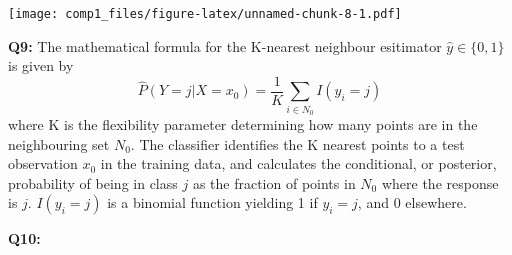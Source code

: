 \documentclass[]{article}
\newenvironment{Shaded}{\begin{snugshade}}{\end{snugshade}}
\newcommand{\KeywordTok}[1]{\textcolor[rgb]{0.13,0.29,0.53}{\textbf{#1}}}
\newcommand{\DataTypeTok}[1]{\textcolor[rgb]{0.13,0.29,0.53}{#1}}
\newcommand{\DecValTok}[1]{\textcolor[rgb]{0.00,0.00,0.81}{#1}}
\newcommand{\StringTok}[1]{\textcolor[rgb]{0.31,0.60,0.02}{#1}}
\newcommand{\CommentTok}[1]{\textcolor[rgb]{0.56,0.35,0.01}{\textit{#1}}}
\newcommand{\OtherTok}[1]{\textcolor[rgb]{0.56,0.35,0.01}{#1}}
\newcommand{\ControlFlowTok}[1]{\textcolor[rgb]{0.13,0.29,0.53}{\textbf{#1}}}
\newcommand{\OperatorTok}[1]{\textcolor[rgb]{0.81,0.36,0.00}{\textbf{#1}}}
\newcommand{\NormalTok}[1]{#1}
\begin{document}
\texttt{[image: comp1\_files/figure-latex/unnamed-chunk-8-1.pdf]}

\textbf{Q9:} The mathematical formula for the K-nearest neighbour
esitimator \(\hat{y} \in \{0,1\}\) is given by \[
\hat{P}(Y = j | X = x_0) = \frac{1}{K}\sum_{i\in N_0}I(y_i = j)
\] where K is the flexibility parameter determining how many points are
in the neighbouring set \(N_0\). The classifier identifies the K nearest
points to a test observation \(x_0\) in the training data, and
calculates the conditional, or posterior, probability of being in class
\(j\) as the fraction of points in \(N_0\) where the response is \(j\).
\(I(y_i = j)\) is a binomial function yielding 1 if \(y_i = j\), and 0
elsewhere.

\textbf{Q10:}

\begin{Shaded}
\end{Shaded}
\end{document}
